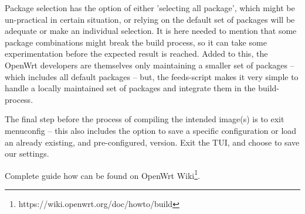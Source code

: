 Package selection has the option of either 'selecting all package', which might be un-practical in certain situation, or relying on the default set of packages will be adequate or make an individual selection.
It is here needed to mention that some package combinations might break the build process, so it can take some experimentation before the expected result is reached.
Added to this, the OpenWrt developers are themselves only maintaining a smaller set of packages – which includes all default packages – but, the feeds-script makes it very simple to handle a locally maintained set of packages and integrate them in the build-process.

The final step before the process of compiling the intended image(s) is to exit menuconfig – this also includes the option to save a specific configuration or load an already existing, and pre-configured, version.
Exit the TUI, and choose to save our settings\cite{build_owrt}.

Complete guide how can be found on OpenWrt Wiki\footnote{https://wiki.openwrt.org/doc/howto/build}.
